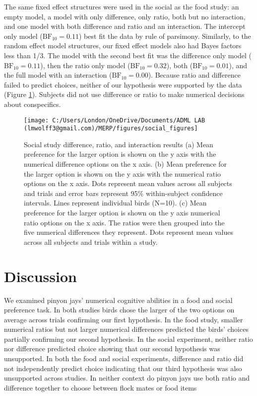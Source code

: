 \documentclass[
  english,
  ,doc,floatsintext]{apa6}
\begin{document}
The same fixed effect structures were used in the social as the food study: an empty model, a model with only difference, only ratio, both but no interaction, and one model with both difference and ratio and an interaction. The intercept only model (\(\mathrm{BF}_{\textrm{10}} = 0.11\)) best fit the data by rule of parsimony. Similarly, to the random effect model structures, our fixed effect models also had Bayes factors less than 1/3. The model with the second best fit was the difference only model (\(\mathrm{BF}_{\textrm{10}} = 0.11\)), then the ratio only model (\(\mathrm{BF}_{\textrm{10}} = 0.32\)), both (\(\mathrm{BF}_{\textrm{10}} = 0.01\)), and the full model with an interaction (\(\mathrm{BF}_{\textrm{10}} = 0.00\)). Because ratio and difference failed to predict choices, neither of our hypothesis were supported by the data (Figure \ref{fig:socialgraphs}). Subjects did not use difference or ratio to make numerical decisions about conspecifics.



\begin{figure}

{\centering \texttt{[image: C:/Users/London/OneDrive/Documents/ADML LAB (lmwolff3@gmail.com)/MERP/figures/social\_figures]} 

}

\caption{Social study difference, ratio, and interaction results (a) Mean preference for the larger option is shown on the y axis with the numerical difference options on the x axis. (b) Mean preference for the larger option is shown on the y axis with the numerical ratio options on the x axis. Dots represent mean values across all subjects and trials and error bars represent 95\% within-subject confidence intervals. Lines represent individual birds (N=10). (c) Mean preference for the larger option is shown on the y axis numerical ratio options on the x axis. The ratios were then grouped into the five numerical differences they represent. Dots represent mean values across all subjects and trials within a study.}\label{fig:socialgraphs}
\end{figure}

\hypertarget{discussion}{%
\section{Discussion}\label{discussion}}

We examined pinyon jays' numerical cognitive abilities in a food and social preference task. In both studies birds chose the larger of the two options on average across trials confirming our first hypothesis. In the food study, smaller numerical ratios but not larger numerical differences predicted the birds' choices partially confirming our second hypothesis. In the social experiment, neither ratio nor difference predicted choice showing that our second hypothesis was unsupported. In both the food and social experiments, difference and ratio did not independently predict choice indicating that our third hypothesis was also unsupported across studies. In neither context do pinyon jays use both ratio and difference together to choose between flock mates or food items
\end{document}

